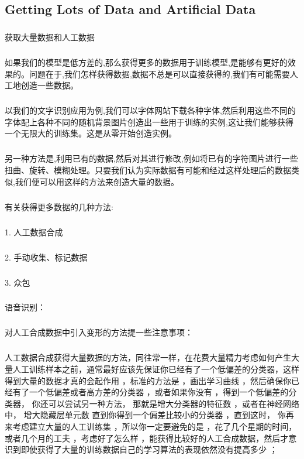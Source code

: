 \documentclass{article}
\begin{document}
\begin{CJK}{UTF8}{gbsn}
\subsection{Getting Lots of Data and Artificial Data}
\subparagraph{}
获取大量数据和人工数据
\subparagraph{}
如果我们的模型是低方差的,那么获得更多的数据用于训练模型,是能够有更好的效果的。问题在于,我们怎样获得数据,数据不总是可以直接获得的,我们有可能需要人工地创造一些数据。
\begin{figure}[H]
\label{fig:2240}
\end{figure}
\subparagraph{}
以我们的文字识别应用为例,我们可以字体网站下载各种字体,然后利用这些不同的字体配上各种不同的随机背景图片创造出一些用于训练的实例,这让我们能够获得一个无限大的训练集。这是从零开始创造实例。
\begin{figure}[H]
\label{fig:2241}
\end{figure}
\subparagraph{}
另一种方法是,利用已有的数据,然后对其进行修改,例如将已有的字符图片进行一些扭曲、旋转、模糊处理。只要我们认为实际数据有可能和经过这样处理后的数据类似,我们便可以用这样的方法来创造大量的数据。
\begin{figure}[H]
\label{fig:2242}
\end{figure}
\subparagraph{}
有关获得更多数据的几种方法:
\subparagraph{}
1. 人工数据合成
\subparagraph{}
2. 手动收集、标记数据
\subparagraph{}
3. 众包
\subparagraph{}
语音识别：
\begin{figure}[H]
\label{fig:2245}
\end{figure}
\subparagraph{}
对人工合成数据中引入变形的方法提一些注意事项：
\begin{figure}[H]
\label{fig:2250}
\end{figure}
\begin{figure}[H]
\label{fig:2251}
\end{figure}
\subparagraph{}
人工数据合成获得大量数据的方法，同往常一样，在花费大量精力考虑如何产生大量人工训练样本之前，通常最好应该先保证你已经有了一个低偏差的分类器，这样得到大量的数据才真的会起作用 ，标准的方法是 ，画出学习曲线 ，然后确保你已经有了一个低偏差或者高方差的分类器 ，或者如果你没有 ，得到一个低偏差的分类器， 你还可以尝试另一种方法， 那就是增大分类器的特征数 ，或者在神经网络中， 增大隐藏层单元数 直到你得到一个偏差比较小的分类器 ，直到这时， 你再来考虑建立大量的人工训练集 ，所以你一定要避免的是 ，花了几个星期的时间， 或者几个月的工夫 ，考虑好了怎么样 ，能获得比较好的人工合成数据，然后才意识到即使获得了大量的训练数据自己的学习算法的表现依然没有提高多少 ；

\end{CJK}
\end{document}
